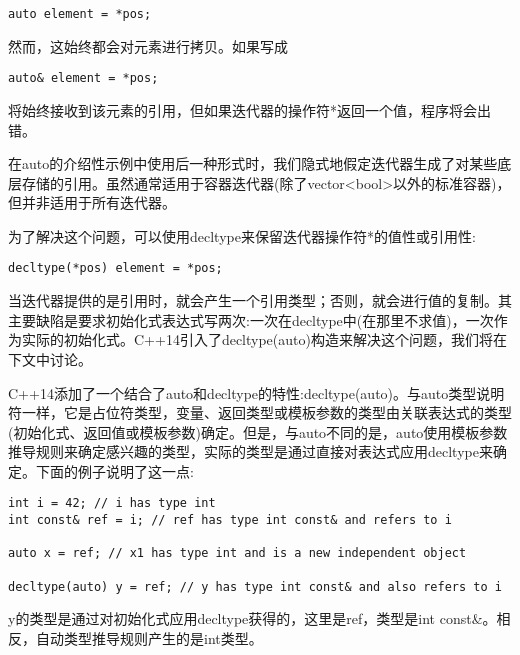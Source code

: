 \begin{lstlisting}[style=styleCXX]
auto element = *pos;
\end{lstlisting}

然而，这始终都会对元素进行拷贝。如果写成

\begin{lstlisting}[style=styleCXX]
auto& element = *pos;
\end{lstlisting}

将始终接收到该元素的引用，但如果迭代器的操作符*返回一个值，程序将会出错。

\begin{tcolorbox}[colback=webgreen!5!white,colframe=webgreen!75!black]
\hspace*{0.75cm}在auto的介绍性示例中使用后一种形式时，我们隐式地假定迭代器生成了对某些底层存储的引用。虽然通常适用于容器迭代器(除了vector<bool>以外的标准容器)，但并非适用于所有迭代器。
\end{tcolorbox}

为了解决这个问题，可以使用decltype来保留迭代器操作符*的值性或引用性:

\begin{lstlisting}[style=styleCXX]
decltype(*pos) element = *pos;
\end{lstlisting}

当迭代器提供的是引用时，就会产生一个引用类型；否则，就会进行值的复制。其主要缺陷是要求初始化式表达式写两次:一次在decltype中(在那里不求值)，一次作为实际的初始化式。C++14引入了decltype(auto)构造来解决这个问题，我们将在下文中讨论。


C++14添加了一个结合了auto和decltype的特性:decltype(auto)。与auto类型说明符一样，它是占位符类型，变量、返回类型或模板参数的类型由关联表达式的类型(初始化式、返回值或模板参数)确定。但是，与auto不同的是，auto使用模板参数推导规则来确定感兴趣的类型，实际的类型是通过直接对表达式应用decltype来确定。下面的例子说明了这一点:

\begin{lstlisting}[style=styleCXX]
int i = 42; // i has type int
int const& ref = i; // ref has type int const& and refers to i

auto x = ref; // x1 has type int and is a new independent object

decltype(auto) y = ref; // y has type int const& and also refers to i
\end{lstlisting}

y的类型是通过对初始化式应用decltype获得的，这里是ref，类型是int const\&。相反，自动类型推导规则产生的是int类型。

